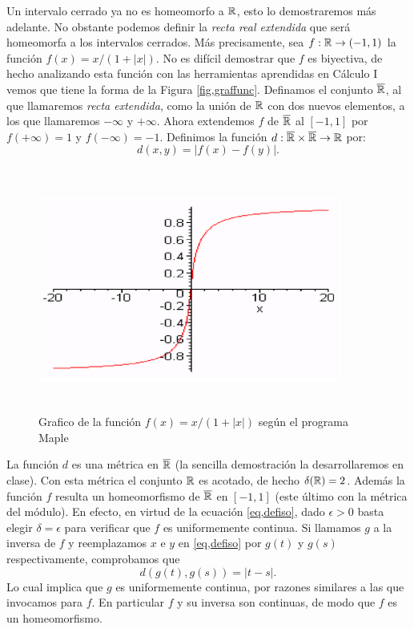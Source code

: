 \begin{ejemplo} Un intervalo cerrado ya no es homeomorfo a $\rr$,
esto lo demostraremos m\'as adelante. No obstante podemos definir
la \emph{recta real extendida} que ser\'a homeomorfa a los
intervalos cerrados. M\'as precisamente, sea $f:\rr\rightarrow
(-1,1)$ la funci\'on $f(x)=x/(1+|x|)$. No es dif\'icil demostrar
que $f$ es biyectiva, de hecho analizando esta funci\'on con las
herramientas aprendidas en C\'alculo I vemos que tiene la forma de
la Figura \vref{fig,graffunc}. Definamos el conjunto
$\overline{\rr}$, al que llamaremos \emph{recta extendida}, como
la uni\'on de $\rr$ con dos nuevos elementos, a los que llamaremos
$-\infty$ y $+\infty$. Ahora extendemos $f$ de $\overline{\rr}$ al
$[-1,1]$ por $f(+\infty)=1$ y $f(-\infty)=-1$. Definimos la
funci\'on $d:\overline{\rr}\times\overline{\rr}\rightarrow \rr$
por: \begin{equation}\label{eq,defiso}
    d(x,y)=|f(x)-f(y)|.
\end{equation}
\begin{figure}[h]
\begin{center}
    \includegraphics[height=8cm, width=10cm]{graffun.eps}
    \caption{Grafico de la funci\'on $f(x)=x/(1+|x|)$ seg\'un el
    programa  Maple}\label{fig,graffunc}
\end{center}
\end{figure}

La funci\'on $d$ es una m\'etrica en $\overline{\rr}$ (la sencilla
demostraci\'on la desarrollaremos en clase). Con esta m\'etrica el
conjunto $\rr$ es acotado, de hecho $\delta(\rr)=2$. Adem\'as la
funci\'on $f$ resulta un homeomorfismo de $\overline{\rr}$ en
$[-1,1]$ (este \'ultimo con la m\'etrica del m\'odulo). En efecto,
en virtud de la ecuaci\'on \vref{eq,defiso}, dado $\epsilon>0$
basta elegir $\delta=\epsilon$ para verificar que $f$ es
uniformemente continua. Si llamamos $g$ a la inversa de $f$ y
reemplazamos $x$ e $y$ en \vref{eq,defiso} por $g(t)$ y $g(s)$
respectivamente, comprobamos que
\begin{equation}\label{eq,defisoinv}
    d(g(t),g(s))=|t-s|.
\end{equation}
Lo cual implica que $g$ es uniformemente continua, por razones
similares a las que invocamos para $f$. En particular $f$ y su
inversa son continuas, de modo que $f$ es un homeomorfismo.


\end{ejemplo}

